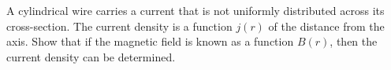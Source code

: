 A cylindrical wire carries a current that is not uniformly distributed
across its cross-section. The current density is a function $j(r)$ of
the distance from the axis. Show that if the magnetic field is known
as a function $B(r)$, then the current density can be determined.
